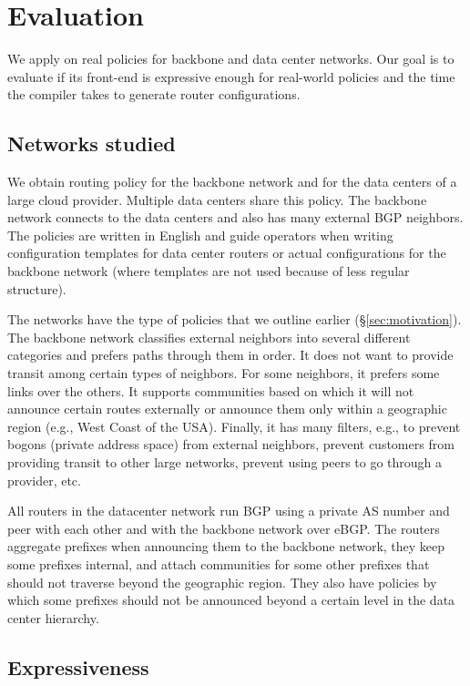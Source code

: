 \section{Evaluation}
\label{sec:evaluation}

We apply \sysname on real policies for backbone and data center networks. Our goal is to evaluate if its front-end is expressive enough for real-world policies and the time the compiler takes to generate router configurations.

\subsection{Networks studied}

We obtain routing policy for the backbone network and for the data centers of a large cloud provider. Multiple data centers share this policy. The backbone network connects to the data centers and also has many external BGP neighbors. The policies are written in English and guide operators when writing configuration templates for data center routers or actual configurations for the backbone network (where templates are not used because of less regular structure).

The networks have the type of policies that we outline earlier (\S\ref{sec:motivation}). The backbone network classifies external neighbors into several different categories and prefers paths through them in order. It does not want to provide transit among certain types of neighbors. For some neighbors, it prefers some links over the others. It supports communities based on which it will not announce certain routes externally or announce them only within a geographic region (e.g., West Coast of the USA). Finally, it has many filters, e.g., to prevent bogons (private address space) from external neighbors, prevent customers from providing transit to other large networks, prevent using peers to go through a provider, etc.

All routers in the datacenter network run BGP using a private AS number and peer with each other and with the backbone network over eBGP. The routers aggregate prefixes when announcing them to the backbone network, they keep some prefixes internal, and attach communities for some other prefixes that should not traverse beyond the geographic region. They also have policies by which some prefixes should not be announced beyond a certain level in the data center hierarchy.

\subsection{Expressiveness}


